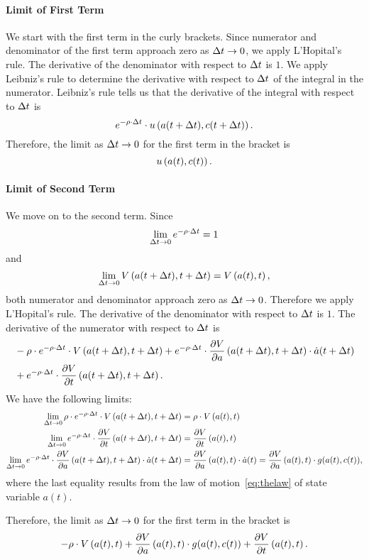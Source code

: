 \documentclass[letterpaper,12pt,leqno]{article}
\begin{document}
\paragraph{Limit of First Term} We start with the first term in the curly brackets. Since numerator and denominator of the first term approach zero as $\Delta t\to 0$,  we apply L'Hopital's rule. The derivative of the denominator with respect to $\Delta t$ is $1$. We apply Leibniz's rule to determine the derivative with respect to $\Delta t$ of the integral in the numerator. Leibniz's rule tells us that the derivative of the integral with respect to $\Delta t$ is
\[e^{-\rho \cdot  \Delta t} \cdot u\left( a(t+\Delta t),c(t+\Delta t) \right).\]
Therefore, the limit as $\Delta t\to 0$ for the first term in the bracket is 
\begin{equation}
u\left(  a(t),c(t) \right).\label{eq:BIG1}
\end{equation}

\paragraph{Limit of Second Term}  We move on to the second term. Since 
\[\lim_{\Delta t\to 0} e^{-\rho \cdot \Delta t}=1\]
and 
\[\lim_{\Delta t\to 0} V\left(  a(t+\Delta t),t+\Delta t \right) =V\left( a(t),t \right), \]
both numerator and denominator approach zero as $\Delta t\to 0$. Therefore we apply L'Hopital's rule. The derivative of the denominator with respect to $\Delta t$ is $1$. The derivative of the numerator with respect to $\Delta t$ is
\begin{align*}
&-\rho \cdot e^{-\rho\cdot \Delta t}\cdot V\left(  a(t+\Delta t),t+\Delta t \right)+e^{-\rho\cdot \Delta t}\cdot \frac{\partial V}{\partial a}\left(  a(t+\Delta t),t+\Delta t \right) \cdot \dot{a}(t+\Delta t)\\
&+e^{-\rho\cdot \Delta t}\cdot  \frac{\partial V}{\partial t}\left( a(t+\Delta t),t+\Delta t \right). 
\end{align*}
We have the following limits:
\begin{align*}
\lim_{\Delta t\to 0} \rho \cdot e^{-\rho\cdot \Delta t}\cdot V\left(  a(t+\Delta t),t+\Delta t \right)&=\rho \cdot V\left(  a(t),t \right)\\
\lim_{\Delta t\to 0} e^{-\rho\cdot \Delta t}\cdot  \frac{\partial V}{\partial t}\left( a(t+\Delta t),t+\Delta t \right) &= \frac{\partial V}{\partial t}\left( a(t),t \right)\\
\lim_{\Delta t\to 0} e^{-\rho\cdot \Delta t}\cdot \frac{\partial V}{\partial a}\left(  a(t+\Delta t),t+\Delta t \right)\cdot\dot{a}(t+\Delta t)&=\frac{\partial V}{\partial a}\left(  a(t),t \right) \cdot \dot{a}(t)=\frac{\partial V}{\partial a}\left(  a(t),t \right) \cdot g(a(t),c(t)),
\end{align*}
where the last equality results from the law of motion~\eqref{eq:thelaw} of state variable $a(t)$.

Therefore, the limit as $\Delta t\to 0$ for the first term in the bracket is 
\begin{equation}
-\rho \cdot V\left(  a(t),t \right)+\frac{\partial  V}{\partial a}\left(  a(t),t \right) \cdot g(a(t),c(t))+\frac{\partial V}{\partial t}\left( a(t),t \right).\label{eq:BIG2}
\end{equation}
\end{document}
